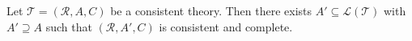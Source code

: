 Let $\mathcal{T} = (\mathcal{R}, A, C)$ be a consistent theory. Then there exists $A' \subseteq \mathcal{L}(\mathcal{T})$ with $A' \supseteq A$ such that $(\mathcal{R}, A', C)$ is consistent and complete.
